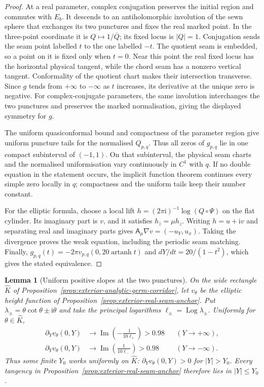 \documentclass[11pt]{amsart}
\newtheorem{lemma}[theorem]{Lemma}
\theoremstyle{definition}
\newcommand{\ii}{\mathrm{i}}
\begin{document}
\begin{proof}
At a real parameter, complex conjugation preserves the initial
region and commutes with $E_b$.  It descends to an antiholomorphic
involution of the sewn sphere that exchanges its two punctures and
fixes the real marked point.  In the three-point coordinate it is
$Q\mapsto1/\overline Q$; its fixed locus is $|Q|=1$.
Conjugation sends the seam point labelled $t$ to the one labelled
$-t$.  The quotient seam is embedded, so a point on it is fixed
only when $t=0$.  Near this point the real fixed locus has the
horizontal physical tangent, while the chord seam has a nonzero
vertical tangent.  Conformality of the quotient chart makes their
intersection transverse.  Since $g$ tends from $+\infty$ to
$-\infty$ as $t$ increases, its derivative at the unique zero is
negative.
For complex-conjugate parameters, the same involution interchanges
the two punctures and preserves the marked normalisation, giving the
displayed symmetry for $g$.

The uniform quasiconformal bound and compactness of the parameter
region give uniform puncture tails for the normalised $Q_{p,q}$.
Thus all zeros of $g_{p,q}$ lie in one compact subinterval of
$(-1,1)$.  On that subinterval, the physical seam charts and the
normalised uniformisation vary continuously in $C^1$ with $q$.
If no double equation in the statement occurs, the implicit
function theorem continues every simple zero locally in $q$;
compactness and the uniform tails keep their number constant.

For the elliptic formula, choose a local lift
$h=(2\pi\ii)^{-1}\log(Q\circ\Psi)$ on the flat cylinder.
Its imaginary part is $v$, and it satisfies
$h_{\bar z}=\mu h_z$.  Writing $h=u+\ii v$ and separating real
and imaginary parts gives
$\mathsf A_\mu\nabla v=(-u_Y,u_x)$.
Taking the divergence proves the weak equation, including the
periodic seam matching.  Finally,
$g_{p,q}(t)=-2\pi v_{p,q}(0,20\operatorname{artanh}t)$ and
$dY/dt=20/(1-t^2)$, which gives the stated equivalence.
\end{proof}

\begin{lemma}[Uniform positive slopes at the two punctures]
\label{lem:exterior-seam-end-slope}
On the wide rectangle $\widehat K$ of
Proposition~\ref{prop:exterior-analytic-germ-corridor}, let
$v_\theta$ be the elliptic height function of
Proposition~\ref{prop:exterior-real-seam-anchor}.  Put
$\lambda_\pm=\theta\cot\theta\pm\ii\theta$ and take the
principal logarithms $\ell_\pm=\operatorname{Log}\lambda_\pm$.
Uniformly for $\theta\in\widehat K$,
\[
 \begin{aligned}
 \partial_Yv_\theta(0,Y)&\longrightarrow
       \operatorname{Im}\!\left(-\frac1{10\ell_+}\right)>0.98
       &&(Y\to+\infty),\\
 \partial_Yv_\theta(0,Y)&\longrightarrow
       \operatorname{Im}\!\left(\frac1{10\ell_-}\right)>0.98
       &&(Y\to-\infty).
 \end{aligned}
\]
Thus some finite $Y_0$ works uniformly on $\widehat K$:
$\partial_Yv_\theta(0,Y)>0$ for $|Y|>Y_0$.
Every tangency in Proposition~\ref{prop:exterior-real-seam-anchor}
therefore lies in $|Y|\le Y_0$.
\end{lemma}
\end{document}
